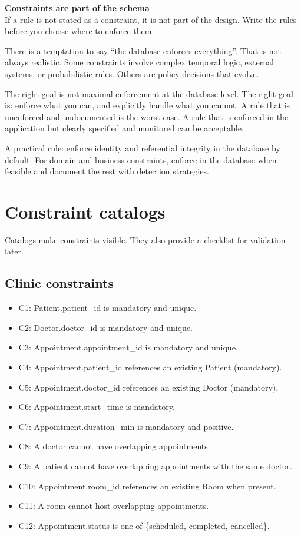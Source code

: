 \begin{principlebox}
\textbf{Constraints are part of the schema}\\
If a rule is not stated as a constraint, it is not part of the design.
Write the rules before you choose where to enforce them.
\end{principlebox}

There is a temptation to say “the database enforces everything”.
That is not always realistic.
Some constraints involve complex temporal logic, external systems, or probabilistic rules.
Others are policy decisions that evolve.

The right goal is not maximal enforcement at the database level.
The right goal is: enforce what you can, and explicitly handle what you cannot.
A rule that is unenforced and undocumented is the worst case.
A rule that is enforced in the application but clearly specified and monitored can be acceptable.

\begin{notebox}
A practical rule: enforce identity and referential integrity in the database by default.
For domain and business constraints, enforce in the database when feasible and document the rest with detection strategies.
\end{notebox}

\section{Constraint catalogs}
Catalogs make constraints visible.
They also provide a checklist for validation later.

\subsection{Clinic constraints}
\begin{itemize}[leftmargin=*,nosep]
  \item C1: Patient.patient\_id is mandatory and unique.
  \item C2: Doctor.doctor\_id is mandatory and unique.
  \item C3: Appointment.appointment\_id is mandatory and unique.
  \item C4: Appointment.patient\_id references an existing Patient (mandatory).
  \item C5: Appointment.doctor\_id references an existing Doctor (mandatory).
  \item C6: Appointment.start\_time is mandatory.
  \item C7: Appointment.duration\_min is mandatory and positive.
  \item C8: A doctor cannot have overlapping appointments.
  \item C9: A patient cannot have overlapping appointments with the same doctor.
  \item C10: Appointment.room\_id references an existing Room when present.
  \item C11: A room cannot host overlapping appointments.
  \item C12: Appointment.status is one of \{scheduled, completed, cancelled\}.
\end{itemize}

